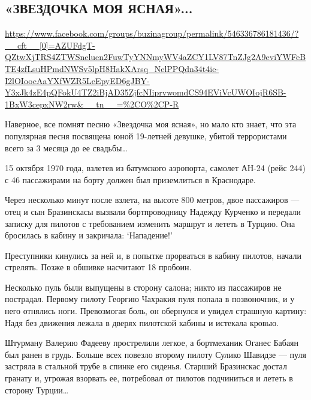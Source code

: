  
 

\subsection{«ЗВЕЗДОЧКА МОЯ ЯСНАЯ»... }
\url{https://www.facebook.com/groups/buzinagroup/permalink/546336786181436/?__cft__[0]=AZUFdgT-QZtwXjTRS4ZTWSneluen2FuwTyYNNmyWV4aZCY1LV87TnZJg2A9eviYWFeBTE4zfLsuHPmdNWSv5lpH8HakXArsq_NelPPQdn34t4ie-I2lOIoocAaYXfWZR5LeEpyED6gJBY-Y3xJk4zE4pQFokU4TZ2iBjAD35ZjfcNIiprvwomdCS94EViVcUWOIojR6SB-1BxW3cepxNW2rw&__tn__=%2CO%2CP-R}

Наверное, все помнят песню «Звездочка моя ясная», но мало кто знает, что эта
популярная песня посвящена юной 19-летней девушке, убитой террористами всего за
3 месяца до ее свадьбы…

15 октября 1970 года, взлетев из батумского аэропорта, самолет АН-24 (рейс 244)
с 46 пассажирами на борту должен был приземлиться в Краснодаре.

Через несколько минут после взлета, на высоте 800 метров, двое пассажиров —
отец и сын Бразинскасы вызвали бортпроводницу Надежду Курченко и передали
записку для пилотов с требованием изменить маршрут и лететь в Турцию. Она
бросилась в кабину и закричала: ‘Нападение!’

Преступники кинулись за ней и, в попытке прорваться в кабину пилотов, начали
стрелять. Позже в обшивке насчитают 18 пробоин.

Несколько пуль были выпущены в сторону салона; никто из пассажиров не
пострадал. Первому пилоту Георгию Чахракия пуля попала в позвоночник, и у него
отнялись ноги.  Превозмогая боль, он обернулся и увидел страшную картину: Надя
без движения лежала в дверях пилотской кабины и истекала кровью.

Штурману Валерию Фадееву прострелили легкое, а бортмеханик Оганес Бабаян был
ранен в грудь. Больше всех повезло второму пилоту Сулико Шавидзе — пуля
застряла в стальной трубе в спинке его сиденья.  Старший Бразинскас достал
гранату и, угрожая взорвать ее, потребовал от пилотов подчиниться и лететь в
сторону Турции…

